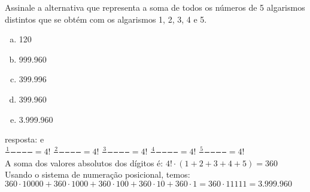 \begin{ex}
 Assinale a alternativa que representa a soma de todos os números de 5 algarismos distintos que se obtém com os algarismos 1, 2, 3, 4 e 5.
    \begin{enumerate}[(a)]
    \item 120
    \item 999.960
    \item 399.996
    \item 399.960
    \item 3.999.960
    \end{enumerate}
      \begin{sol}
        resposta: e \\
      $\frac{1}{\phantom{A}}\frac{\phantom{A}}{\phantom{A}}\frac{\phantom{A}}{\phantom{A}}\frac{\phantom{A}}{\phantom{A}}\frac{\phantom{A}}{\phantom{A}} = 4!$\hspace{0,4cm} $\frac{2}{\phantom{A}}\frac{\phantom{A}}{\phantom{A}}\frac{\phantom{A}}{\phantom{A}}\frac{\phantom{A}}{\phantom{A}}\frac{\phantom{A}}{\phantom{A}} = 4!$
     \hspace{0,4cm} $\frac{3}{\phantom{A}}\frac{\phantom{A}}{\phantom{A}}\frac{\phantom{A}}{\phantom{A}}\frac{\phantom{A}}{\phantom{A}}\frac{\phantom{A}}{\phantom{A}} = 4!$
     \hspace{0,4cm}
      $\frac{4}{\phantom{A}}\frac{\phantom{A}}{\phantom{A}}\frac{\phantom{A}}{\phantom{A}}\frac{\phantom{A}}{\phantom{A}}\frac{\phantom{A}}{\phantom{A}} = 4!$ \hspace{0,4cm}
     $\frac{5}{\phantom{A}}\frac{\phantom{A}}{\phantom{A}}\frac{\phantom{A}}{\phantom{A}}\frac{\phantom{A}}{\phantom{A}}\frac{\phantom{A}}{\phantom{A}} = 4!$ \\
     A soma dos valores absolutos dos dígitos é: $4!\cdot(1+2+3+4+5)=360$\\
     Usando o sistema de numeração posicional, temos:\\
     $360\cdot10000+360\cdot1000+360\cdot100+360\cdot10+360\cdot1=360\cdot11111=3.999.960$
        \end{sol}
\end{ex}
